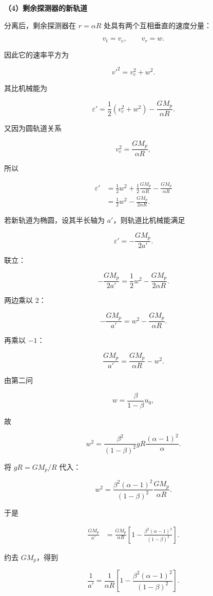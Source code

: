 \documentclass[12pt,a4paper,UTF8]{ctexart}
\begin{document}
\textbf{（4）剩余探测器的新轨道}

分离后，剩余探测器在 \(r=\alpha R\) 处具有两个互相垂直的速度分量：

\[v_t=v_c,\qquad v_r=w.\]

因此它的速率平方为

\[v'^2=v_c^2+w^2.\]

其比机械能为

\[\varepsilon'
=\frac12(v_c^2+w^2)
-\frac{GM_{\!p}}{\alpha R}.\]

又因为圆轨道关系

\[v_c^2=\frac{GM_{\!p}}{\alpha R},\]

所以

\[\begin{aligned}
\varepsilon'
&=\frac12w^2
+\frac12\frac{GM_{\!p}}{\alpha R}
-\frac{GM_{\!p}}{\alpha R}\\
&=\frac12w^2-\frac{GM_{\!p}}{2\alpha R}.
\end{aligned}\]

若新轨道为椭圆，设其半长轴为 \(a'\)，则轨道比机械能满足

\[\varepsilon'=-\frac{GM_{\!p}}{2a'}.\]

联立：

\[-\frac{GM_{\!p}}{2a'}
=\frac12w^2-\frac{GM_{\!p}}{2\alpha R}.\]

两边乘以 \(2\)：

\[-\frac{GM_{\!p}}{a'}
=w^2-\frac{GM_{\!p}}{\alpha R}.\]

再乘以 \(-1\)：

\[\frac{GM_{\!p}}{a'}
=\frac{GM_{\!p}}{\alpha R}-w^2.\]

由第二问

\[w=\frac{\beta}{1-\beta}u_0,\]

故

\[w^2=
\frac{\beta^2}{(1-\beta)^2}
gR\frac{(\alpha-1)^2}{\alpha}.\]

将 \(gR=GM_{\!p}/R\) 代入：

\[w^2=
\frac{\beta^2(\alpha-1)^2}{(1-\beta)^2}
\frac{GM_{\!p}}{\alpha R}.\]

于是

\[\begin{aligned}
\frac{GM_{\!p}}{a'}
&=\frac{GM_{\!p}}{\alpha R}
\left[
1-\frac{\beta^2(\alpha-1)^2}{(1-\beta)^2}
\right].
\end{aligned}\]

约去 \(GM_{\!p}\)，得到

\[\frac1{a'}=
\frac1{\alpha R}
\left[
1-\frac{\beta^2(\alpha-1)^2}{(1-\beta)^2}
\right].\]
\end{document}
